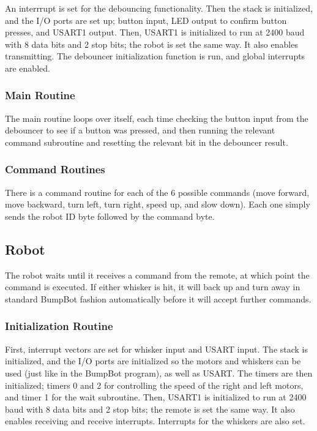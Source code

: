\documentclass[12pt,letterpaper]{article}
\begin{document}
An interrrupt is set for the debouncing functionality.  Then the stack is
initialized, and the I/O ports are set up; button input, LED output to confirm
button presses, and USART1 output.  Then, USART1 is initialized to run at 2400
baud with 8 data bits and 2 stop bits; the robot is set the same way.  It also
enables transmitting.  The debouncer initialization function is run, and global
interrupts are enabled.

\subsubsection{Main Routine}

The main routine loops over itself, each time checking the button input from
the debouncer to see if a button was pressed, and then running the relevant
command subroutine and resetting the relevant bit in the debouncer result.

\subsubsection{Command Routines}

There is a command routine for each of the 6 possible commands (move forward,
move backward, turn left, turn right, speed up, and slow down).  Each one
simply sends the robot ID byte followed by the command byte.

\subsection{Robot}

The robot waits until it receives a command from the remote, at which point the
command is executed.  If either whisker is hit, it will back up and turn away
in standard BumpBot fashion automatically before it will accept further
commands.

\subsubsection{Initialization Routine}

First, interrupt vectors are set for whisker input and USART input.  The stack
is initialized, and the I/O ports are initialized so the motors and whiskers
can be used (just like in the BumpBot program), as well as USART.  The timers
are then initialized; timers 0 and 2 for controlling the speed of the right and
left motors, and timer 1 for the wait subroutine.  Then, USART1 is initialized
to run at 2400 baud with 8 data bits and 2 stop bits; the remote is set the
same way.  It also enables receiving and receive interrupts.  Interrupts for
the whiskers are also set.
\end{document}
